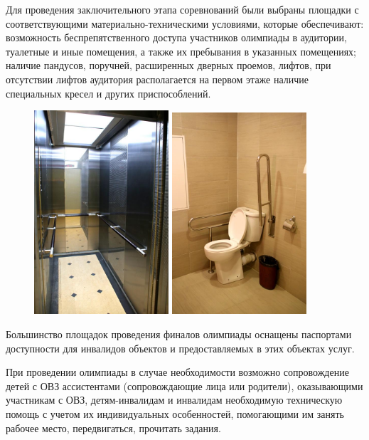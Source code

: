 Для проведения заключительного этапа соревнований были выбраны площадки с соответствующими материально-техническими условиями, которые обеспечивают: возможность беспрепятственного доступа участников олимпиады в аудитории, туалетные и иные помещения, а также их пребывания в указанных помещениях; наличие пандусов, поручней, расширенных дверных проемов, лифтов, при отсутствии лифтов аудитория располагается на первом этаже наличие специальных кресел и других приспособлений. 

\begin{figure}[H]
    \begin{center}
    \includegraphics[width=5cm]{history/info/vrs/i2}
    \includegraphics[width=5cm]{history/info/vrs/i3}
\end{center}
\end{figure}

Большинство площадок проведения финалов олимпиады оснащены паспортами доступности для инвалидов объектов и предоставляемых в этих объектах услуг.

При проведении олимпиады в случае необходимости возможно сопровождение детей с ОВЗ ассистентами (сопровождающие лица или родители), оказывающими участникам с ОВЗ, детям-инвалидам и инвалидам необходимую техническую помощь с учетом их индивидуальных особенностей, помогающими им занять рабочее место, передвигаться, прочитать задания. 

